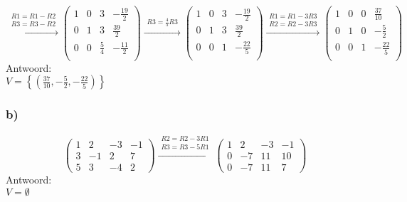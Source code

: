 \documentclass[11pt]{article}
\begin{document}
\[ 
\overset{\begin{matrix}
  R1=R1-R2\\
  R3=R3-R2
 \end{matrix}}{\rightarrow} 
 \begin{pmatrix}
  1 & 0 & 3 & -\frac{19}{2} \\
  0 & 1 & 3 & \frac{39}{2} \\
  0 & 0 & \frac{5}{4} & -\frac{11}{2} \\
 \end{pmatrix}
 \overset{\begin{matrix}
  R3 = \frac{4}{5}R3
 \end{matrix}}{\rightarrow} 
 \begin{pmatrix}
  1 & 0 & 3 & -\frac{19}{2} \\
  0 & 1 & 3 & \frac{39}{2} \\
  0 & 0 & 1 & -\frac{22}{5} \\
 \end{pmatrix}
 \overset{\begin{matrix}
  R1 = R1 - 3R3 \\
  R2 = R2 - 3R3
 \end{matrix}}{\rightarrow}
  \begin{pmatrix}
  1 & 0 & 0 & \frac{37}{10} \\
  0 & 1 & 0 & -\frac{5}{2} \\
  0 & 0 & 1 & -\frac{22}{5} \\
 \end{pmatrix}
\]
Antwoord:\\
$ V = \left\{\left(\frac{37}{10}, -\frac{5}{2}, -\frac{22}{5}\right)\right\}$

\subsubsection*{b)}
\[
\left(
\begin{array}{ccc|c}
1 & 2 & -3 & -1 \\
3 & -1 & 2 & 7 \\
5 & 3 & -4 & 2
\end{array}
\right)
\overset{\begin{matrix}
  R2 = R2 - 3R1 \\
  R3 = R3 - 5R1
 \end{matrix}}{\rightarrow}
 \left(
\begin{array}{ccc|c}
1 & 2 & -3 & -1 \\
0 & -7 & 11 & 10 \\
0 & -7 & 11 & 7
\end{array}
\right)
\]
Antwoord:\\
$V = \emptyset$
\end{document}
